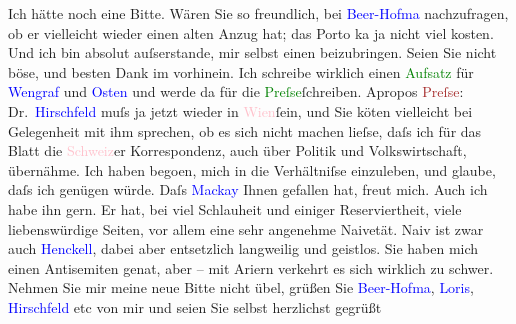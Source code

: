            \pstart
           Ich hätte noch eine Bitte. Wären Sie so freundlich, bei \textcolor{blue}{Beer-Hofma{\geminationn}}{}\ledrightnote{\textcolor{blue}{Richard Beer-Hofmann}} nachzufragen, ob er vielleicht wieder einen {\pb}alten Anzug hat; das Porto ka{\geminationn} ja nicht viel kosten. Und ich bin absolut
                    auſserstande, mir selbst einen beizubringen. Seien Sie nicht böse, und besten
                    Dank im vorhinein.\pend
           \pstart
           Ich schreibe wirklich einen \textcolor{green}{Aufsatz}{} für \textcolor{blue}{Wengraf}{}\ledrightnote{\textcolor{blue}{Edmund Wengraf}} und \textcolor{blue}{Osten}{}\ledrightnote{\textcolor{blue}{Heinrich Osten}} und werde da{\geminationn}{ }\label{K_L00499_1v}\label{K_L00499_1h} für die \textcolor{green}{Preſse}{}\ledrightnote{\textcolor{green}{Die Presse}}{ }ſchreiben. Apropos \textcolor{brown}{Preſse}{}\ledrightnote{\textcolor{brown}{Die Presse}}: Dr. \textcolor{blue}{Hirschfeld}{}\ledrightnote{\textcolor{blue}{Robert Hirschfeld}} muſs ja
                    jetzt wieder in \textcolor{pink}{Wien}{}\ledrightnote{\textcolor{pink}{Wien}}{ }ſein, und Sie kö{\geminationn}ten vielleicht bei Gelegenheit mit ihm sprechen, ob es sich nicht machen
                    lieſse, daſs ich für das Blatt die \textcolor{pink}{Schweiz}{}\ledrightnote{\textcolor{pink}{Schweiz}}er
                    Korrespondenz, auch über Politik und Volkswirtschaft, übernähme. Ich haben
                        bego{\geminationn}en, mich in die Verhältniſse einzuleben,
                    und glaube, daſs ich genügen würde.\pend
           \pstart
           Daſs \textcolor{blue}{Mackay}{}\ledrightnote{\textcolor{blue}{John Henry Mackay}} Ihnen gefallen hat, freut mich.
                    Auch ich habe ihn gern. Er hat, bei viel Schlauheit und einiger Reserviertheit,
                    viele liebenswürdige Seiten, vor allem eine sehr angenehme Naivetät. Naiv ist
                    zwar auch \textcolor{blue}{Henckell}{}\ledrightnote{\textcolor{blue}{Karl Friedrich Henckell}}, dabei aber entsetzlich
                    langweilig und geistlos. Sie haben mich einen Antisemiten gena{\geminationn}t, aber – mit Ariern verkehrt es sich wirklich zu
                    schwer.\pend
           \pstart
           {\pb}Nehmen Sie mir meine neue Bitte nicht
                    übel, grüßen Sie \textcolor{blue}{Beer-Hofma{\geminationn}}{}\ledrightnote{\textcolor{blue}{Richard Beer-Hofmann}}, \textcolor{blue}{Loris}{}\ledrightnote{\textcolor{blue}{Hugo von Hofmannsthal}}, \textcolor{blue}{Hirschfeld}{}\ledrightnote{\textcolor{blue}{Robert Hirschfeld}} etc von mir und seien Sie selbst herzlichst gegrüßt\pend
